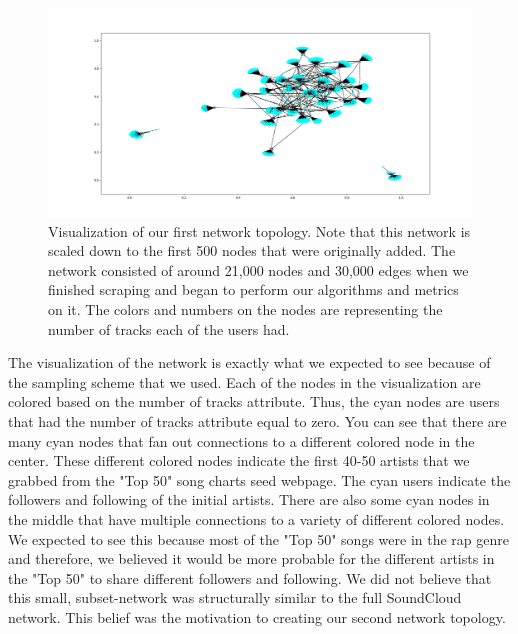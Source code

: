 \documentclass{article}
\begin{document}
\begin{figure}[h]
	\centering
	\includegraphics[scale=0.29]{take_1_visualization}
	\caption{Visualization of our first network topology.  Note that this network is scaled down to the first 500 nodes that were originally added.  The network consisted of around 21,000 nodes and 30,000 edges when we finished scraping and began to perform our algorithms and metrics on it.  The colors and numbers on the nodes are representing the number of tracks each of the users had.}
\end{figure}

The visualization of the network is exactly what we expected to see because of the sampling scheme that we used.  Each of the nodes in the visualization are colored based on the number of tracks attribute.  Thus, the cyan nodes are users that had the number of tracks attribute equal to zero.  You can see that there are many cyan nodes that fan out connections to a different colored node in the center.  These different colored nodes indicate the first 40-50 artists that we grabbed from the "Top 50" song charts seed webpage.  The cyan users indicate the followers and following of the initial artists.  There are also some cyan nodes in the middle that have multiple connections to a variety of different colored nodes.  We expected to see this because most of the "Top 50" songs were in the rap genre and therefore, we believed it would be more probable for the different artists in the "Top 50" to share different followers and following.  We did not believe that this small, subset-network was structurally similar to the full SoundCloud network.  This belief was the motivation to creating our second network topology.
\end{document}
